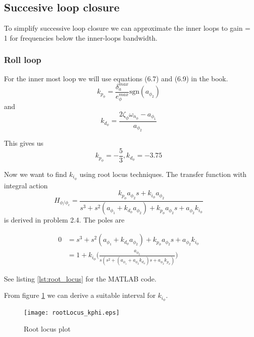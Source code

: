\subsection{Succesive loop closure}


To simplify successive loop closure we can approximate the inner loops to gain = 1 for frequencies below the inner-loops bandwidth. 

\subsubsection{Roll loop}
For the inner most loop we will use equations (6.7) and (6.9) in the book.
\begin{equation*}
    k_{p_\phi} = \frac{\delta^{max}_a}{e^{max}_\phi} \text{sgn}(a_{\phi_2})
\end{equation*} and 
\begin{equation*}
    k_{d_\phi} = \frac{2 \zeta_\phi \omega_{n_\phi} - a_{\phi_1}}{a_{\phi_2}}
\end{equation*}

This gives us 
\begin{equation*}
    k_{p_\phi} = -\frac{5}{3}, k_{d_\phi} = -3.75
\end{equation*}

Now we want to find $k_{i_\phi}$ using root locus techniques. The transfer function with integral action $$H_{\phi/\phi_c} = \frac{k_{p_\phi}a_{\phi_2}s + k_{i_\phi}a_{\phi_2}}{s^3 + s^2(a_{\phi_1} + k_{d_\phi} a_{\phi_2}) + k_{p_\phi}a_{\phi_2}s + a_{\phi_2} k_{i_\phi}}$$ is derived in problem 2.4. 
The poles are 
\begin{equations}
    \begin{align*}
        0 &=s^3 + s^2(a_{\phi_1} + k_{d_\phi} a_{\phi_2}) + k_{p_\phi}a_{\phi_2}s + a_{\phi_2} k_{i_\phi} \\
        &= 1 + k_{i_\phi} \Big( \frac{a_{\phi_2}}{s(s^2 + (a_{\phi_1} + a_{\phi_2}k_{d_\phi})s + a_{\phi_2} k_{p_\phi})}  \Big)
    \end{align*}
\end{equations}
See listing \ref{lst:root_locus} for the MATLAB code. 

From figure \ref{fig:root_locus} we can derive a suitable interval for $k_{i_\phi}$.
\begin{figure}[h!]
    \centering
    \texttt{[image: rootLocus\_kphi.eps]}
    \caption{Root locus plot}
    \label{fig:root_locus}
\end{figure}

